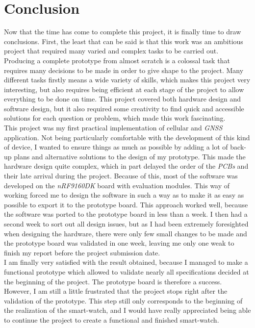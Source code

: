 \documentclass[Report.tex]{subfiles}
\begin{document}
\chapter{Conclusion}

Now that the time has come to complete this project, it is finally time to draw conclusions. First, the least that can be said is that this work was an ambitious project that required many varied and complex tasks to be carried out. Producing a complete prototype from almost scratch is a colossal task that requires many decisions to be made in order to give shape to the project. Many different tasks firstly means a wide variety of skills, which makes this project very interesting, but also requires being efficient at each stage of the project to allow everything to be done on time. This project covered both hardware design and software design, but it also required some creativity to find quick and accessible solutions for each question or problem, which made this work fascinating.\\

This project was my first practical implementation of cellular and \textit{GNSS} application. Not being particularly comfortable with the development of this kind of device, I wanted to ensure things as much as possible by adding a lot of back-up plans and alternative solutions to the design of my prototype. This made the hardware design quite complex, which in part delayed the order of the \textit{PCBs} and their late arrival during the project. Because of this, most of the software was developed on the \textit{nRF9160DK} board with evaluation modules. This way of working forced me to design the software in such a way as to make it as easy as possible to export it to the prototype board. This approach worked well, because the software was ported to the prototype board in less than a week. I then had a second week to sort out all design issues, but as I had been extremely foresighted when designing the hardware, there were only few small changes to be made and the prototype board was validated in one week, leaving me only one weak to finish my report before the project submission date.\\

I am finally very satisfied with the result obtained, because I managed to make a functional prototype which allowed to validate nearly all specifications decided at the beginning of the project. The prototype board is therefore a success. However, I am still a little frustrated that the project stops right after the validation of the prototype. This step still only corresponds to the beginning of the realization of the smart-watch, and I would have really appreciated being able to continue the project to create a functional and finished smart-watch.
\end{document}
